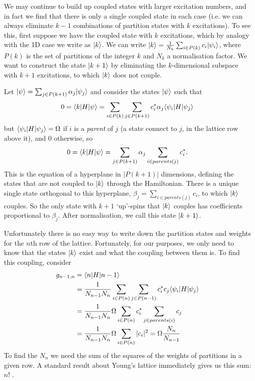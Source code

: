       We may continue to build up coupled states with larger excitation numbers, and in fact we find that there is only a single coupled state in each case (i.e. we can always eliminate $k-1$ combinations of partition states with $k$ excitations).  To see this, first suppose we have the coupled state with $k$ excitations, which by analogy with the 1D case we write as $\vert k\rangle$. We can write $\vert k\rangle=\frac{1}{N_k}\sum_{i\in P(k)}c_{i}\vert\psi_{i}\rangle$, where $P(k)$ is the set of partitions of the integer $k$ and $N_k$ a normalisation factor. We want to construct the state $\vert k+1\rangle$ by eliminating the $k$-dimensional subspace with $k+1$ excitations, to which $\vert k\rangle$ does not couple.

      Let $\vert\psi\rangle=\sum_{j\in P(k+1)}\alpha_{j}\vert\psi_{j}\rangle$ and consider the states $\vert\psi\rangle$ such that \[ 0=\langle k\vert H\vert\psi\rangle=\sum_{i\in P(k)}\sum_{j\in P(k+1)}c_{i}^{*}\alpha_{j}\langle \psi_{i}\vert H\vert\psi_{j}\rangle\] but $\langle \psi_{i}\vert H\vert\psi_{j}\rangle=\Omega$ if $i$ is a {\it parent} of $j$ (a state connect to $j$, in the lattice row above it), and $0$ otherwise, so \[0=\langle k\vert H\vert\psi\rangle=\sum_{j\in P(k+1)}\alpha_{j}\sum_{i\in parents(j)}c_{i}^{*}.\] This is the equation of a hyperplane in $|P(k+1)|$ dimensions, defining the states that are not coupled to $\vert k\rangle$ through the Hamiltonian.  There is a unique single state orthogonal to this hyperplane, $\beta_{j}=\sum_{i\in parents(j)}c_{i}$, to which $\vert k\rangle$ couples.  So the only state with $k+1$ `up'-spins that $\vert k\rangle$ couples has coefficients proportional to $\beta_{j}$. After normalisation, we call this state $\vert k+1\rangle$.

      Unfortunately there is no easy way to write down the partition states and weights for the $n$th row of the lattice. Fortunately, for our purposes, we only need to know that the states $\vert k\rangle$ exist and what the coupling between them is. To find this coupling, consider
      \begin{align}
      g_{n-1,n} & = \langle n\vert H\vert n-1\rangle \nonumber\\
        & = \frac{1}{N_{n-1}N_n}\sum_{i\in P(n)}\sum_{j\in
          P(n-1)}c_{i}^{*}c_{j}\langle \psi_{i}\vert H\vert\psi_{j}\rangle \nonumber\\
            & = \frac{1}{N_{n-1}N_n}\Omega\sum_{i\in P(n)}c_{i}^{*}\sum_{j\in
              parents(i)}c_{j} \nonumber\\
                & = \frac{1}{N_{n-1}N_n}\Omega\sum_{i\in P(n)}|c_{i}|^{2} =
                \Omega\frac{ N_n}{N_{n-1}}\label{coupling_as_sum_c2}\end{align}
                To find the $N_n$ we need the sum of the squares of the weights of partitions in a given row. A standard result about Young's lattice immediately gives us this sum: $n!$ \cite{STANLEY:1975p6605}.

